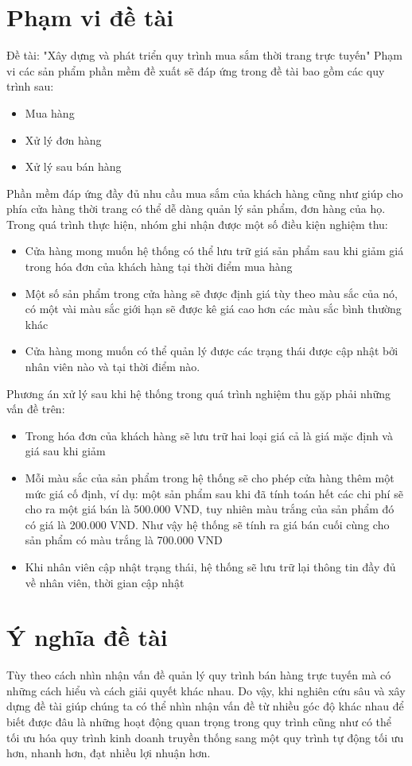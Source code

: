 \documentclass[12pt,a4paper,2sides]{report}
\begin{document}
\section{Phạm vi đề tài} 
Đề tài: "Xây dựng và phát triển quy trình mua sắm thời trang trực tuyến"
Phạm vi các sản phẩm phần mềm đề xuất sẽ đáp ứng trong đề tài bao gồm các quy trình sau:
\begin{itemize}
    \item Mua hàng
    \item Xử lý đơn hàng
    \item Xử lý sau bán hàng
\end{itemize}
Phần mềm đáp ứng đầy đủ nhu cầu mua sắm của khách hàng cũng như giúp cho phía cửa hàng thời trang có thể dễ dàng quản lý sản phẩm, đơn hàng của họ. 
Trong quá trình thực hiện, nhóm ghi nhận được một số điều kiện nghiệm thu:
\begin{itemize}
    \item Cửa hàng mong muốn hệ thống có thể lưu trữ giá sản phẩm sau khi giảm giá trong hóa đơn của khách hàng tại thời điểm mua hàng
    \item Một số sản phẩm trong cửa hàng sẽ được định giá tùy theo màu sắc của nó, có một vài màu sắc giới hạn sẽ được kê giá cao hơn các màu sắc bình thường khác
    \item Cửa hàng mong muốn có thể quản lý được các trạng thái được cập nhật bởi nhân viên nào và tại thời điểm nào.
\end{itemize}
Phương án xử lý sau khi hệ thống trong quá trình nghiệm thu gặp phải những vấn đề trên:
\begin{itemize}
    \item Trong hóa đơn của khách hàng sẽ lưu trữ hai loại giá cả là giá mặc định và giá sau khi giảm 
    \item Mỗi màu sắc của sản phẩm trong hệ thống sẽ cho phép cửa hàng thêm một mức giá cố định, ví dụ: một sản phẩm sau khi đã tính toán hết các chi phí sẽ cho ra một giá bán là 500.000 VND, tuy nhiên màu trắng của sản phẩm đó có giá là 200.000 VND. Như vậy hệ thống sẽ tính ra giá bán cuối cùng cho sản phẩm có màu trắng là 700.000 VND
    \item Khi nhân viên cập nhật trạng thái, hệ thống sẽ lưu trữ lại thông tin đầy đủ về nhân viên, thời gian cập nhật
\end{itemize}
\section{Ý nghĩa đề tài}
Tùy theo cách nhìn nhận vấn đề quản lý quy trình bán hàng trực tuyến mà có những cách hiểu và cách giải quyết khác nhau. Do vậy, khi nghiên cứu sâu và xây dựng đề tài giúp chúng ta có thể nhìn nhận vấn đề từ nhiều góc độ khác nhau để biết được đâu là những hoạt động quan trọng trong quy trình cũng như có thể tối ưu hóa quy trình kinh doanh truyền thống sang một quy trình tự động tối ưu hơn, nhanh hơn, đạt nhiều lợi nhuận hơn.
\end{document}
